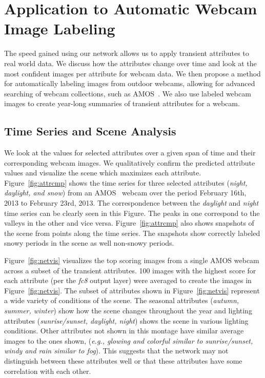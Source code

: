 \documentclass[10pt,twocolumn,letterpaper]{article}
\newcommand{\figref}[1]{Figure~\ref{fig:#1}}
\begin{document}
\section{Application to Automatic Webcam Image Labeling}

The speed gained using our network allows us to apply transient attributes to
real world data.  We discuss how the attributes change over time and look at
the most confident images per attribute for webcam data.  We then propose a
method for automatically labeling images from outdoor webcams, allowing for
advanced searching of webcam collections, such as AMOS~\cite{jacobs07amos}. We
also use labeled webcam images to create year-long summaries of transient
attributes for a webcam.

\subsection{Time Series and Scene Analysis}

We look at the values for selected attributes over a given span of time and
their corresponding webcam images.  We qualitatively confirm the predicted
attribute values and visualize the scene which maximizes each attribute.
\figref{attrcmp} shows the time series for three selected attributes
(\textit{night, daylight, and snow}) from an AMOS~\cite{jacobs07amos} webcam
over the period February 16th, 2013 to February 23rd, 2013.  The correspondence
between the \textit{daylight} and \textit{night} time series can be clearly
seen in this Figure.  The peaks in one correspond to the valleys in the other
and vice versa.  \figref{attrcmp} also shows snapshots of the scene from points
along the time series.  The snapshots show correctly labeled snowy periods in
the scene as well non-snowy periods.

\figref{netvis} visualizes the top scoring images from a single
AMOS webcam across a subset of the transient attributes.
100 images with the highest score for each attribute (per the \textit{fc8}
output layer) were averaged to create the images in \figref{netvis}.  The
subset of attributes shown in \figref{netvis} represent a wide variety of
conditions of the scene.  The seasonal attributes (\textit{autumn, summer,
winter}) show how the scene changes throughout the year and lighting attributes
(\textit{sunrise/sunset, daylight, night}) shows the scene in various lighting
conditions.  Other attributes not shown in this montage have similar average
images to the ones shown, (\textit{e.g., glowing and colorful similar to
sunrise/sunset, windy and rain similar to fog}).  This suggests that the
network may not distinguish between these attributes well or that these
attributes have some correlation with each other.
\end{document}
